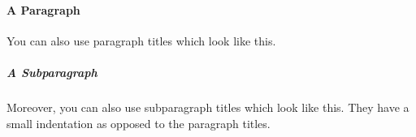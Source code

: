 \paragraph{A Paragraph}
You can also use paragraph titles which look like this.

\subparagraph{A Subparagraph} Moreover, you can also use subparagraph titles which look like this. They have a small indentation as opposed to the paragraph titles.


